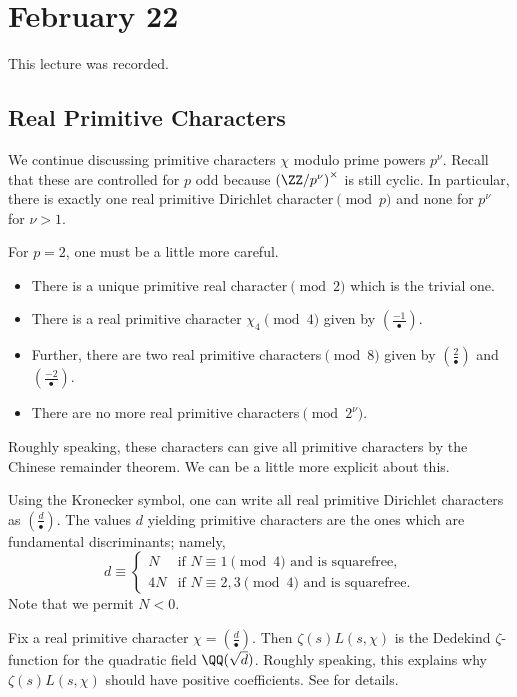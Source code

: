 \documentclass[../notes.tex]{subfiles}
\begin{document}
\section{February 22}

This lecture was recorded.

\subsection{Real Primitive Characters}
We continue discussing primitive characters $\chi$ modulo prime powers $p^\nu$. Recall that these are controlled for $p$ odd because $\left(\ZZ/p^\nu\right)^\times$ is still cyclic. In particular, there is exactly one real primitive Dirichlet character$\pmod{p}$ and none for $p^\nu$ for $\nu>1$.

For $p=2$, one must be a little more careful.
\begin{itemize}
	\item There is a unique primitive real character$\pmod2$ which is the trivial one.
	\item There is a real primitive character $\chi_4\pmod4$ given by $\left(\frac{-1}\bullet\right)$.
	\item Further, there are two real primitive characters$\pmod8$ given by $\left(\frac2\bullet\right)$ and $\left(\frac{-2}\bullet\right)$.
	\item There are no more real primitive characters$\pmod{2^\nu}$.
\end{itemize}
Roughly speaking, these characters can give all primitive characters by the Chinese remainder theorem. We can be a little more explicit about this.
\begin{remark}
	Using the Kronecker symbol, one can write all real primitive Dirichlet characters as $\left(\frac d\bullet\right)$. The values $d$ yielding primitive characters are the ones which are fundamental discriminants; namely,
	\[d\equiv\begin{cases}
		N & \text{if }N\equiv1\pmod4\text{ and is squarefree}, \\
		4N & \text{if }N\equiv2,3\pmod4\text{ and is squarefree}.
	\end{cases}\]
	Note that we permit $N<0$.
\end{remark}
\begin{remark}
	Fix a real primitive character $\chi=\left(\frac d\bullet\right)$. Then $\zeta(s)L(s,\chi)$ is the Dedekind $\zeta$-function for the quadratic field $\QQ(\sqrt d)$. Roughly speaking, this explains why $\zeta(s)L(s,\chi)$ should have positive coefficients. See \cite[Chapter~6]{davenport-mult-nt} for details.
\end{remark}
\end{document}
